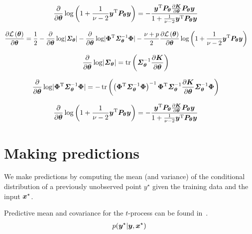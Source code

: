 \documentclass[twoside]{article}
\newcommand{\Sigmat}{\bSigma_{\B{\theta}}}
\newcommand{\Pt}{\B{P}_{\B{\theta}}}
\begin{document}
\begin{align}
    \frac{\partial}{\partial \B{\theta}} \logt\left(1 + \frac{1}{\nu-2}\B{y}\transpose\Pt\B{y}\right)     &=
   - \frac{\B{y}\tp\Pt \frac{\partial \B{K}}{\partial \B{\theta}}\Pt\B{y}}{1 + \frac{1}{\nu-2}\B{y}\transpose\Pt\B{y}}
\end{align}

\begin{align}
     \frac{\partial\lik{\B{\theta}}}{\partial \B{\theta}}
     &=
    \frac{1}{2} -\frac{\partial}{\partial \B{\theta}}\logt \lvert \Sigmat \rvert
    -\frac{\partial}{\partial \B{\theta}}\logt \lvert \B{\Phi}\tp\Sigmat^{-1}\B{\Phi} \rvert
      -\frac{\nu+p}{2} \frac{\partial\lik{\B{\theta}}}{\partial \B{\theta}} \logt\left(1 + \frac{1}{\nu-2}\B{y}\transpose\Pt\B{y}\right)
\end{align}

\begin{align}
    \frac{\partial}{\partial \B{\theta}}\logt \lvert \Sigmat \rvert     &=
    \tr\left(\Sigmat^{-1} \frac{\partial \B{K}}{\partial \B{\theta}} \right)
\end{align}

\begin{align}
    \frac{\partial}{\partial \B{\theta}}\logt \lvert \B{\Phi}\tp\Sigmat^{-1}\B{\Phi} \rvert     &=
    -\tr\left( \left(\B{\Phi}\tp\Sigmat^{-1}\B{\Phi}\right)^{-1} \B{\Phi}\tp\Sigmat^{-1}\frac{\partial \B{K}}{\partial \B{\theta}}\Sigmat^{-1}\B{\Phi} \right)
\end{align}

\begin{align}
    \frac{\partial}{\partial \B{\theta}} \logt\left(1 + \frac{1}{\nu-2}\B{y}\transpose\Pt\B{y}\right)     &=
   - \frac{\B{y}\tp\Pt \frac{\partial \B{K}}{\partial \B{\theta}}\Pt\B{y}}{1 + \frac{1}{\nu-2}\B{y}\transpose\Pt\B{y}}
\end{align}


\section{Making predictions}
We make predictions by computing the mean (and variance) of the conditional distribution of a previously unobserved point $y^{\star}$ given the training data and the input $\bm{x}^{\star}$.

Predictive mean and covariance for the $t$-process can be found in~\cite{shah2014student}.
\begin{align*}
p(\bm{y}^{\star}|\bm{y}, \bm{x}^{\star})
\end{align*}
\end{document}
